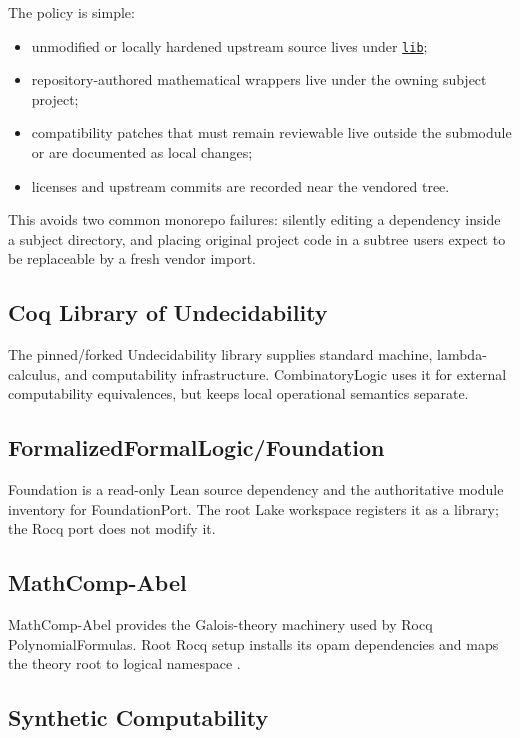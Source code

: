 \documentclass[
  10pt,
  a4paper,
  twoside,
  open=any,
  parskip=half,
  headings=big
]{scrreprt}
\newcommand{\CommitFull}{675d0a2ff0fc624fba199e006049016ba806f40a}
\newcommand{\RepoTreeBase}{https://github.com/VladimirReshetnikov/ProveIt/tree/\CommitFull/}
\newcommand{\RepoDir}[1]{%
  \href{\RepoTreeBase\detokenize{#1}}{\nolinkurl{#1}}}
\newcommand{\code}[1]{\texttt{\detokenize{#1}}}
\begin{document}
The policy is simple:

\begin{itemize}
  \item unmodified or locally hardened upstream source lives under
        \RepoDir{lib};
  \item repository-authored mathematical wrappers live under the owning
        subject project;
  \item compatibility patches that must remain reviewable live outside the
        submodule or are documented as local changes;
  \item licenses and upstream commits are recorded near the vendored tree.
\end{itemize}

This avoids two common monorepo failures: silently editing a dependency inside
a subject directory, and placing original project code in a subtree users
expect to be replaceable by a fresh vendor import.

\subsection{Coq Library of Undecidability}

The pinned/forked Undecidability library supplies standard machine,
lambda-calculus, and computability infrastructure.  CombinatoryLogic uses it
for external computability equivalences, but keeps local operational semantics
separate.

\subsection{FormalizedFormalLogic/Foundation}

Foundation is a read-only Lean source dependency and the authoritative module
inventory for FoundationPort.  The root Lake workspace registers it as a
library; the Rocq port does not modify it.

\subsection{MathComp-Abel}

MathComp-Abel provides the Galois-theory machinery used by Rocq
PolynomialFormulas.  Root Rocq setup installs its opam dependencies and maps
the theory root to logical namespace \code{Abel}.

\subsection{Synthetic Computability}
\end{document}
